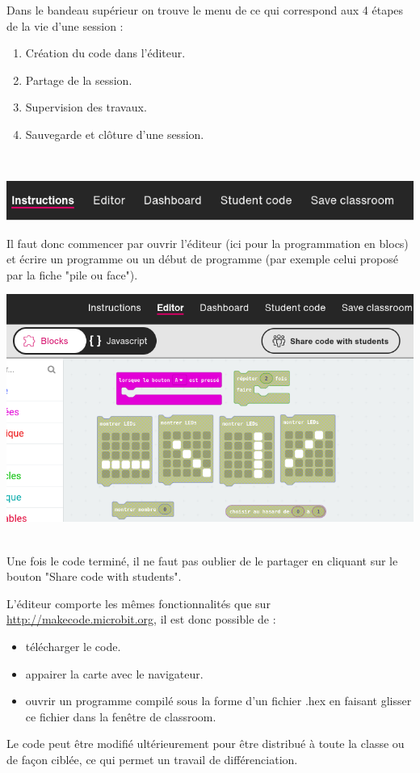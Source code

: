 \begin{methode}
    Dans le bandeau supérieur on trouve le menu de ce qui correspond aux 4 étapes
     de la vie d'une session :
     \begin{enumerate}
        \item Création du code dans l'éditeur.
        \item Partage de la session.
        \item Supervision des travaux.
        \item Sauvegarde et clôture d'une session.
     \end{enumerate}~\\

    \centerline{\includegraphics[width=0.8\linewidth]{res/classroom_menu.png}}
    
    Il faut donc commencer par ouvrir l'éditeur (ici pour la programmation en blocs) et écrire
    un programme ou un début de programme (par exemple celui proposé par la fiche "pile ou face").
    \vspace{5mm}

    \centerline{\includegraphics[width=0.6\linewidth]{res/classroom_editor.png}}~\\

    Une fois le code terminé, il ne faut pas oublier de le partager en cliquant sur le bouton
     "Share code with students".

\end{methode}


\begin{remarque}
    L'éditeur comporte les mêmes fonctionnalités que sur \url{http://makecode.microbit.org}, il est donc possible de :
    \begin{itemize}
        \item télécharger le code.
        \item appairer la carte \mb avec le navigateur.
        \item ouvrir un programme compilé sous la forme d'un fichier .hex en faisant glisser ce fichier
        dans la fenêtre de classroom.
        
    \end{itemize}
    
    Le code peut être modifié ultérieurement pour être distribué à toute la classe ou de façon ciblée,
     ce qui permet un travail de différenciation.
 
\end{remarque}


